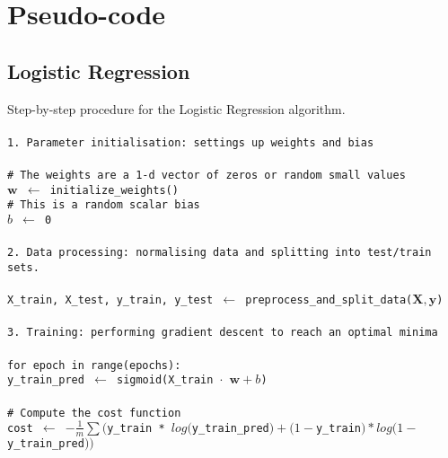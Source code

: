 \documentclass[10pt]{article}
\begin{document}

\pagebreak
\appendix


\section{Pseudo-code}
\subsection{Logistic Regression}
\noindent Step-by-step procedure for the Logistic Regression algorithm.
\texttt{
\\\\
1. Parameter initialisation: settings up weights and bias
\\\\
\# The weights are a 1-d vector of zeros or random small values\\
\(\mathbf{w}\) \(\leftarrow\) initialize\_weights()\\
\# This is a random scalar bias\\
\(b\) \(\leftarrow\) 0
\\\\
2. Data processing: normalising data and splitting into test/train sets.
\\\\
X\_train, X\_test, y\_train, y\_test \(\leftarrow\) preprocess\_and\_split\_data(\(\mathbf{X}, \mathbf{y}\))
\\\\
3. Training: performing gradient descent to reach an optimal minima
\\\\
for epoch in range(epochs):\\
\hspace*{2em} y\_train\_pred \(\leftarrow\) sigmoid(X\_train \(\cdot\) \(\mathbf{w} + b\))
\\\\
\hspace*{2em} \# Compute the cost function\\
\hspace*{2em} cost \(\leftarrow\) \(-\frac{1}{m} \sum(\)y\_train * \(log(\)y\_train\_pred\() + (1 - \)y\_train\() * log(1 - \)y\_train\_pred\())\)
\\\\
}
\end{document}
